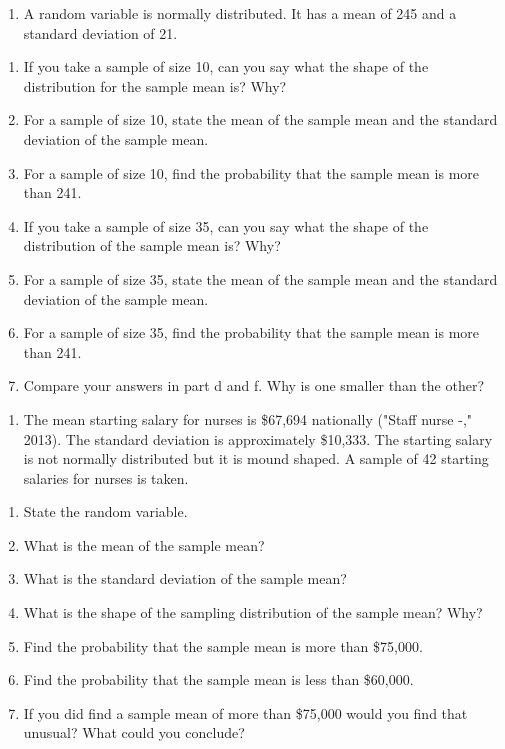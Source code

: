 \documentclass[]{book}
\providecommand{\tightlist}{%
  \setlength{\itemsep}{0pt}\setlength{\parskip}{0pt}}
\begin{document}
\begin{enumerate}
\def\labelenumi{\arabic{enumi}.}
\setcounter{enumi}{1}
\tightlist
\item
  A random variable is normally distributed. It has a mean of 245 and a standard deviation of 21.
\end{enumerate}

\begin{enumerate}
\def\labelenumi{\alph{enumi}.}
\item
  If you take a sample of size 10, can you say what the shape of the distribution for the sample mean is? Why?
\item
  For a sample of size 10, state the mean of the sample mean and the standard deviation of the sample mean.
\item
  For a sample of size 10, find the probability that the sample mean is more than 241.
\item
  If you take a sample of size 35, can you say what the shape of the distribution of the sample mean is? Why?
\item
  For a sample of size 35, state the mean of the sample mean and the standard deviation of the sample mean.
\item
  For a sample of size 35, find the probability that the sample mean is more than 241.
\item
  Compare your answers in part d and f. Why is one smaller than the other?
\end{enumerate}

\begin{enumerate}
\def\labelenumi{\arabic{enumi}.}
\setcounter{enumi}{2}
\tightlist
\item
  The mean starting salary for nurses is \$67,694 nationally ("Staff nurse -," 2013). The standard deviation is approximately \$10,333. The starting salary is not normally distributed but it is mound shaped. A sample of 42 starting salaries for nurses is taken.
\end{enumerate}

\begin{enumerate}
\def\labelenumi{\alph{enumi}.}
\item
  State the random variable.
\item
  What is the mean of the sample mean?
\item
  What is the standard deviation of the sample mean?
\item
  What is the shape of the sampling distribution of the sample mean? Why?
\item
  Find the probability that the sample mean is more than \$75,000.
\item
  Find the probability that the sample mean is less than \$60,000.
\item
  If you did find a sample mean of more than \$75,000 would you find that unusual? What could you conclude?
\end{enumerate}
\end{document}
